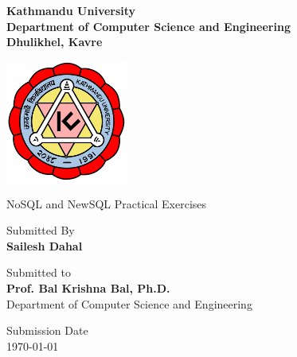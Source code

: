 \documentclass[12pt,a4paper]{report}
\begin{document}
\begin{titlepage}
  \centering

  \vspace*{1cm}

  {\Large\bfseries Kathmandu University\\
    Department of Computer Science and Engineering\\
    Dhulikhel, Kavre}

  \vspace{1.5cm}

  \includegraphics[width=0.3\textwidth]{ku-logo.png}

  \vspace{1.5cm}

  {\large NoSQL and NewSQL Practical Exercises}

  \vspace{1cm}
  {\large Submitted By\\
    \textbf{Sailesh Dahal}}

  \vspace{1.5cm}

  {\large Submitted to\\
    \textbf{Prof. Bal Krishna Bal, Ph.D.}\\
    Department of Computer Science and Engineering}

  \vspace{1.5cm}

  {\large Submission Date\\
    \today}

  \vfill

\end{titlepage}

\tableofcontents













\printbibliography

\appendix


\end{document}
